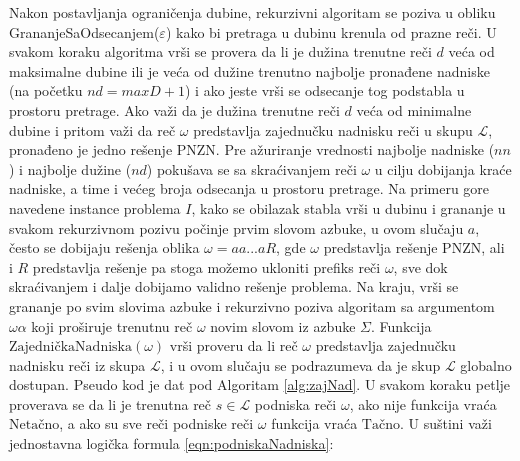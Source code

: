\documentclass[12pt,oneside]{memoir}
\begin{document}
Nakon postavljanja ograničenja dubine, rekurzivni algoritam se poziva
u obliku GrananjeSaOdsecanjem($\varepsilon$) kako bi pretraga u dubinu krenula od prazne reči.
U svakom koraku algoritma vrši se provera da li je dužina trenutne reči $d$ veća od maksimalne dubine ili je veća od
dužine trenutno najbolje pronađene nadniske (na početku $nd=maxD + 1$) i ako jeste vrši se odsecanje tog podstabla u prostoru
pretrage. Ako važi da je dužina trenutne reči $d$ veća od minimalne dubine i pritom važi da reč
$\omega$ predstavlja zajednučku nadnisku reči u skupu $\mathcal{L}$, pronađeno je jedno rešenje PNZN.
Pre ažuriranje vrednosti najbolje nadniske ($nn$) i najbolje dužine ($nd$) pokušava se sa skraćivanjem
reči $\omega$ u cilju dobijanja kraće nadniske, a time i većeg broja odsecanja u prostoru pretrage.
Na primeru gore navedene instance problema $I$, kako se obilazak stabla vrši u dubinu i grananje u svakom
rekurzivnom pozivu počinje prvim slovom azbuke, u ovom slučaju $a$, često se dobijaju rešenja
oblika $\omega=aa...aR$, gde $\omega$ predstavlja rešenje PNZN, ali i $R$ predstavlja rešenje pa stoga
možemo ukloniti prefiks reči $\omega$, sve dok skraćivanjem i dalje dobijamo validno rešenje problema.
Na kraju, vrši se grananje po svim slovima azbuke i rekurzivno poziva algoritam sa argumentom $\omega\alpha$
koji proširuje trenutnu reč $\omega$ novim slovom iz azbuke $\Sigma$. Funkcija $\textrm{ZajedničkaNadniska}(\omega)$ vrši proveru
da li reč $\omega$ predstavlja zajednučku nadnisku reči iz skupa $\mathcal{L}$, i u ovom slučaju se podrazumeva
da je skup $\mathcal{L}$ globalno dostupan. Pseudo kod je dat pod Algoritam \ref{alg:zajNad}. 
U svakom koraku petlje proverava se da li je trenutna reč $s\in\mathcal{L}$ podniska reči $\omega$,
ako nije funkcija vraća $\textrm{Netačno}$, a ako su sve reči podniske reči $\omega$ funkcija vraća $\textrm{Tačno}$.
U suštini važi jednostavna logička formula \ref{eqn:podniskaNadniska}:
\end{document}

